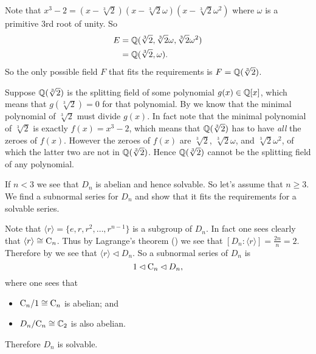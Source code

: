\begin{questions}
    \item \begin{partquestions}{\roman*}
        \item Note that $x^3 - 2 = (x-\sqrt[3]2)(x-\sqrt[3]2\omega)(x-\sqrt[3]2\omega^2)$ where $\omega$ is a primitive 3rd root of unity. So
        \begin{align*}
            E &= \mathbb{Q}(\sqrt[3]2, \sqrt[3]2\omega, \sqrt[3]2\omega^2)\\
            &= \mathbb{Q}(\sqrt[3]2,\omega).
        \end{align*}
        So the only possible field $F$ that fits the requirements is $F = \mathbb{Q}(\sqrt[3]2)$.
        
        \item Suppose $\mathbb{Q}(\sqrt[3]2)$ is the splitting field of some polynomial $g(x) \in \mathbb{Q}[x]$, which means that $g(\sqrt[3]2) = 0$ for that polynomial. By  we know that the minimal polynomial of $\sqrt[3]2$ must divide $g(x)$. In fact note that the minimal polynomial of $\sqrt[3]2$ is exactly $f(x) = x^3 - 2$, which means that $\mathbb{Q}(\sqrt[3]2)$ has to have \textit{all} the zeroes of $f(x)$. However the zeroes of $f(x)$ are $\sqrt[3]2$, $\sqrt[3]2\omega$, and $\sqrt[3]2\omega^2$, of which the latter two are not in $\mathbb{Q}(\sqrt[3]2)$. Hence $\mathbb{Q}(\sqrt[3]2)$ cannot be the splitting field of any polynomial.
    \end{partquestions}
    
    \item If $n < 3$ we see that $D_n$ is abelian and hence solvable. So let's assume that $n \geq 3$. We find a subnormal series for $D_n$ and show that it fits the requirements for a solvable series.
    
    Note that $\langle r \rangle = \{e, r, r^2, \dots, r^{n-1}\}$ is a subgroup of $D_n$. In fact one sees clearly that $\langle r \rangle \cong \mathrm{C}_{n}$. Thus by Lagrange's theorem () we see that $[D_n:\langle r \rangle] = \frac{2n}{n} = 2$. Therefore by  we see that $\langle r \rangle \lhd D_n$. So a subnormal series of $D_n$ is
    \[
        1 \lhd \mathrm{C}_{n} \lhd D_n,
    \]
    where one sees that
    \begin{itemize}
        \item $\mathrm{C}_{n}/1 \cong \mathrm{C}_{n}$ is abelian; and
        \item $D_n/\mathrm{C}_{n} \cong \mathbb{C}_2$ is also abelian.
    \end{itemize}
    Therefore $D_n$ is solvable.
    

\end{questions}
